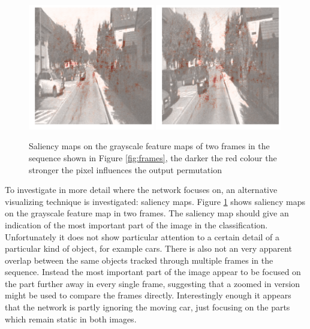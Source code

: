 \begin{figure}[t]
\centering
\includegraphics[width=0.49\textwidth]{images/saliency_1-0.png}
\includegraphics[width=0.49\textwidth]{images/saliency_1-1.png}
\caption{Saliency maps on the grayscale feature maps of two frames in the sequence shown in Figure \ref{fig:frames}, the darker the red colour the stronger the pixel influences the output permutation}
\label{fig:saliency}
\end{figure}

To investigate in more detail where the network focuses on, an alternative visualizing technique is investigated: saliency maps. Figure \ref{fig:saliency} shows saliency maps on the grayscale feature map in two frames. The saliency map should give an indication of the most important part of the image in the classification. Unfortunately it does not show particular attention to a certain detail of a particular kind of object, for example cars. There is also not an very apparent overlap between the same objects tracked through multiple frames in the sequence. Instead the most important part of the image appear to be focused on the part further away in every single frame, suggesting that a zoomed in version might be used to compare the frames directly. Interestingly enough it appears that the network is partly ignoring the moving car, just focusing on the parts which remain static in both images.  

